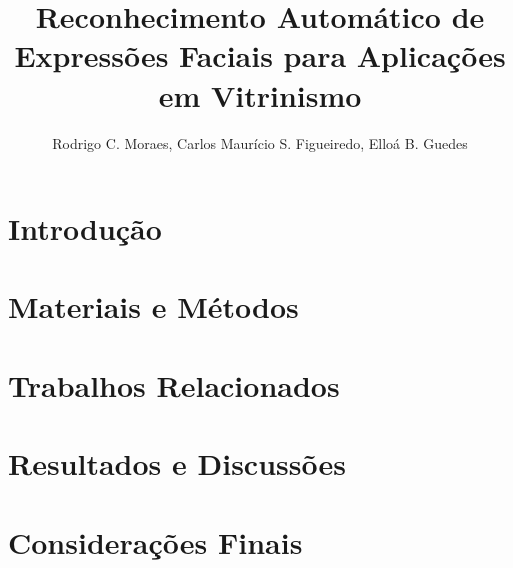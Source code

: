 \documentclass[12pt]{article}
\title{Reconhecimento Automático de Expressões Faciais para Aplicações em Vitrinismo}
\author{Rodrigo C. Moraes, Carlos Maurício S. Figueiredo, Elloá B. Guedes \email{\{rcm, cfigueiredo, ebgcosta\}.eng@uea.edu.br}
}
\begin{document}
\maketitle




\section{Introdução}


\section{Materiais e Métodos}


\section{Trabalhos Relacionados}


\section{Resultados e Discussões}


\section{Considerações Finais}





\end{document}

